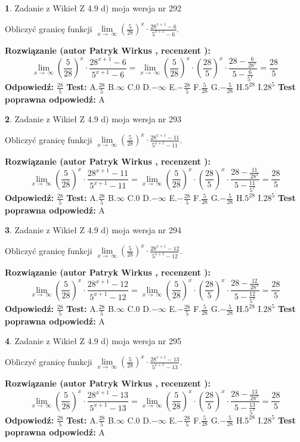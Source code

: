\documentclass[12pt, a4paper]{article}
\theoremstyle{definition} %
\newtheorem{zad}{}
\newcommand{\zadStart}[1]{\begin{zad}#1\newline}
\newcommand{\zadStop}{\end{zad}}
\newcommand{\rozwStart}[2]{\noindent \textbf{Rozwiązanie (autor #1 , recenzent #2): }\newline}
\newcommand{\rozwStop}{\newline}
\newcommand{\odpStart}{\noindent \textbf{Odpowiedź:}\newline}
\newcommand{\odpStop}{\newline}
\newcommand{\testStart}{\noindent \textbf{Test:}\newline}
\newcommand{\testStop}{\newline}
\newcommand{\kluczStart}{\noindent \textbf{Test poprawna odpowiedź:}\newline}
\newcommand{\kluczStop}{\newline}
\begin{document}
\zadStart{Zadanie z Wikieł Z 4.9 d) moja wersja nr 292}


Obliczyć granicę funkcji  $\lim\limits_{x\to\ \infty}(\frac{5}{28})^{x}\cdot\frac{28^{x+1}-6}{5^{x+1}-6}$.
\zadStop
\rozwStart{Patryk Wirkus}{}
$$\lim\limits_{x\to\ \infty}(\frac{5}{28})^{x}\cdot\frac{28^{x+1}-6}{5^{x+1}-6}=\lim\limits_{x\to\ \infty}(\frac{5}{28})^{x}\cdot(\frac{28}{5})^{x} \cdot \frac{28-\frac{6}{28^{x}}}{5-\frac{6}{5^{x}}} = \frac{28}{5}$$
\rozwStop
\odpStart
$\frac{28}{5}$
\odpStop
\testStart
A.$\frac{28}{5}$ B.$\infty$ C.$0$ D.$-\infty$ E.$-\frac{28}{5}$
F.$\frac{5}{28}$ G.$-\frac{5}{28}$
H.$5^{28}$
I.$28^{5}$
\testStop
\kluczStart
A
\kluczStop



\zadStart{Zadanie z Wikieł Z 4.9 d) moja wersja nr 293}


Obliczyć granicę funkcji  $\lim\limits_{x\to\ \infty}(\frac{5}{28})^{x}\cdot\frac{28^{x+1}-11}{5^{x+1}-11}$.
\zadStop
\rozwStart{Patryk Wirkus}{}
$$\lim\limits_{x\to\ \infty}(\frac{5}{28})^{x}\cdot\frac{28^{x+1}-11}{5^{x+1}-11}=\lim\limits_{x\to\ \infty}(\frac{5}{28})^{x}\cdot(\frac{28}{5})^{x} \cdot \frac{28-\frac{11}{28^{x}}}{5-\frac{11}{5^{x}}} = \frac{28}{5}$$
\rozwStop
\odpStart
$\frac{28}{5}$
\odpStop
\testStart
A.$\frac{28}{5}$ B.$\infty$ C.$0$ D.$-\infty$ E.$-\frac{28}{5}$
F.$\frac{5}{28}$ G.$-\frac{5}{28}$
H.$5^{28}$
I.$28^{5}$
\testStop
\kluczStart
A
\kluczStop



\zadStart{Zadanie z Wikieł Z 4.9 d) moja wersja nr 294}


Obliczyć granicę funkcji  $\lim\limits_{x\to\ \infty}(\frac{5}{28})^{x}\cdot\frac{28^{x+1}-12}{5^{x+1}-12}$.
\zadStop
\rozwStart{Patryk Wirkus}{}
$$\lim\limits_{x\to\ \infty}(\frac{5}{28})^{x}\cdot\frac{28^{x+1}-12}{5^{x+1}-12}=\lim\limits_{x\to\ \infty}(\frac{5}{28})^{x}\cdot(\frac{28}{5})^{x} \cdot \frac{28-\frac{12}{28^{x}}}{5-\frac{12}{5^{x}}} = \frac{28}{5}$$
\rozwStop
\odpStart
$\frac{28}{5}$
\odpStop
\testStart
A.$\frac{28}{5}$ B.$\infty$ C.$0$ D.$-\infty$ E.$-\frac{28}{5}$
F.$\frac{5}{28}$ G.$-\frac{5}{28}$
H.$5^{28}$
I.$28^{5}$
\testStop
\kluczStart
A
\kluczStop



\zadStart{Zadanie z Wikieł Z 4.9 d) moja wersja nr 295}


Obliczyć granicę funkcji  $\lim\limits_{x\to\ \infty}(\frac{5}{28})^{x}\cdot\frac{28^{x+1}-13}{5^{x+1}-13}$.
\zadStop
\rozwStart{Patryk Wirkus}{}
$$\lim\limits_{x\to\ \infty}(\frac{5}{28})^{x}\cdot\frac{28^{x+1}-13}{5^{x+1}-13}=\lim\limits_{x\to\ \infty}(\frac{5}{28})^{x}\cdot(\frac{28}{5})^{x} \cdot \frac{28-\frac{13}{28^{x}}}{5-\frac{13}{5^{x}}} = \frac{28}{5}$$
\rozwStop
\odpStart
$\frac{28}{5}$
\odpStop
\testStart
A.$\frac{28}{5}$ B.$\infty$ C.$0$ D.$-\infty$ E.$-\frac{28}{5}$
F.$\frac{5}{28}$ G.$-\frac{5}{28}$
H.$5^{28}$
I.$28^{5}$
\testStop
\kluczStart
A
\kluczStop
\end{document}
